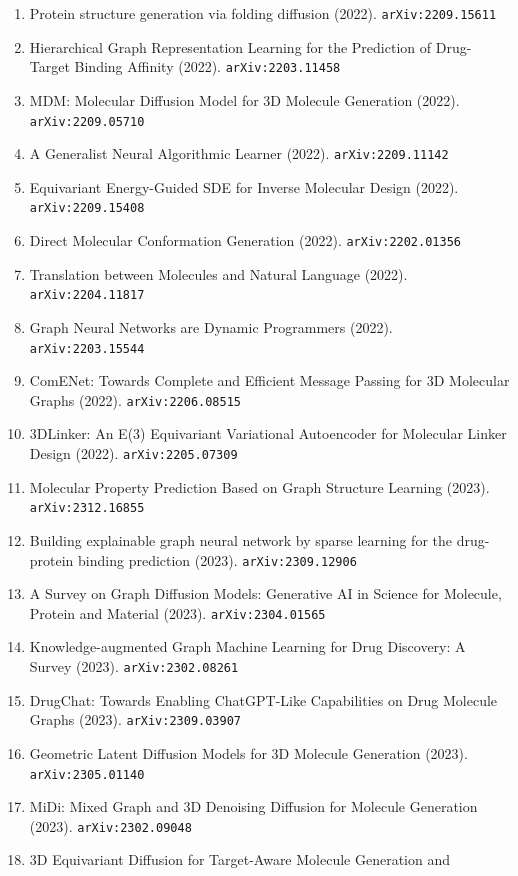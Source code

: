 \documentclass[11pt]{article}
\begin{document}
\begin{enumerate}
  \item Protein structure generation via folding diffusion (2022). \texttt{arXiv:2209.15611}
  \item Hierarchical Graph Representation Learning for the Prediction of
  Drug-Target Binding Affinity (2022). \texttt{arXiv:2203.11458}
  \item MDM: Molecular Diffusion Model for 3D Molecule Generation (2022). \texttt{arXiv:2209.05710}
  \item A Generalist Neural Algorithmic Learner (2022). \texttt{arXiv:2209.11142}
  \item Equivariant Energy-Guided SDE for Inverse Molecular Design (2022). \texttt{arXiv:2209.15408}
  \item Direct Molecular Conformation Generation (2022). \texttt{arXiv:2202.01356}
  \item Translation between Molecules and Natural Language (2022). \texttt{arXiv:2204.11817}
  \item Graph Neural Networks are Dynamic Programmers (2022). \texttt{arXiv:2203.15544}
  \item ComENet: Towards Complete and Efficient Message Passing for 3D Molecular
  Graphs (2022). \texttt{arXiv:2206.08515}
  \item 3DLinker: An E(3) Equivariant Variational Autoencoder for Molecular
  Linker Design (2022). \texttt{arXiv:2205.07309}
  \item Molecular Property Prediction Based on Graph Structure Learning (2023). \texttt{arXiv:2312.16855}
  \item Building explainable graph neural network by sparse learning for the
  drug-protein binding prediction (2023). \texttt{arXiv:2309.12906}
  \item A Survey on Graph Diffusion Models: Generative AI in Science for
  Molecule, Protein and Material (2023). \texttt{arXiv:2304.01565}
  \item Knowledge-augmented Graph Machine Learning for Drug Discovery: A Survey (2023). \texttt{arXiv:2302.08261}
  \item DrugChat: Towards Enabling ChatGPT-Like Capabilities on Drug Molecule
  Graphs (2023). \texttt{arXiv:2309.03907}
  \item Geometric Latent Diffusion Models for 3D Molecule Generation (2023). \texttt{arXiv:2305.01140}
  \item MiDi: Mixed Graph and 3D Denoising Diffusion for Molecule Generation (2023). \texttt{arXiv:2302.09048}
  \item 3D Equivariant Diffusion for Target-Aware Molecule Generation and

\end{enumerate}
\end{document}
